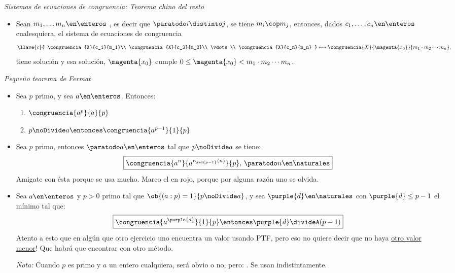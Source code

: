 \textit{Sistemas de ecuaciones de congruencia: Teorema chino del resto}
\begin{itemize}
  \item
        Sean $m_1,\dots m_n \en \enteros$ \underline{}, es decir que $\paratodo i \distinto j$, se tiene $m_i \cop m_j$,
        entonces, dados $c_1,\dots, c_n \en \enteros$ cualesquiera, el sistema de ecuaciones de congruencia
        $$
          \llave{c}{
            \congruencia{X}{c_1}{m_1}\\
            \congruencia{X}{c_2}{m_2}\\
            \vdots\\
            \congruencia{X}{c_n}{m_n}
          } \leftrightsquigarrow
          \congruencia{X}{\magenta{x_0}}{m_1\cdot m_2 \cdots m_n},
        $$
        tiene solución y esa solución, $\magenta{x_0}$ cumple $0 \leq \magenta{x_0} < m_1\cdot m_2 \cdots m_n$.
\end{itemize}\bigskip

\textit{Pequeño teorema de Fermat}
\begin{itemize}
  \item Sea $p$ primo, y sea $a \en \enteros$. Entonces:
        \begin{enumerate}[label=\arabic*)]
          \item $ \congruencia{a^p}{a}{p} $
          \item $ p \noDivide a \entonces \congruencia{a^{p-1}}{1}{p} $
        \end{enumerate}

  \item Sea $p$ primo, entonces $ \paratodo a \en \enteros$ tal que $ p \noDivide a$ se tiene:
        $$
          \boxed{
            \congruencia{a^n}{a^{r_{\red{p-1}}(n)}}{p} ,\, \paratodo n \en \naturales
          }
        $$
        Amigate con ésta porque se usa mucho. Marco el  en rojo, porque por alguna razón uno se olvida.

  \item Sea $a \en \enteros$ y $p > 0$ primo tal que $\ob{(a:p) = 1}{p \noDivide a}$, y sea
        $\purple{d} \en \naturales$ con $\purple{d} \leq p - 1$
        el mínimo tal que:
        $$
          \boxed{
            \congruencia{a^{\purple{d}}}{1}{p} \entonces \purple{d} \divideA (p-1)
          }
        $$
                Atento a esto que en algún que otro ejercicio uno encuentra un valor usando PTF, pero eso no quiere
                decir que no haya \underline{otro valor menor}! Que habrá que encontrar con otro método.\par

                \textit{Nota:} Cuando $p$ es primo y $a$ un entero cualquiera, será obvio o no, pero: .
                Se usan indistintamente.
\end{itemize}
